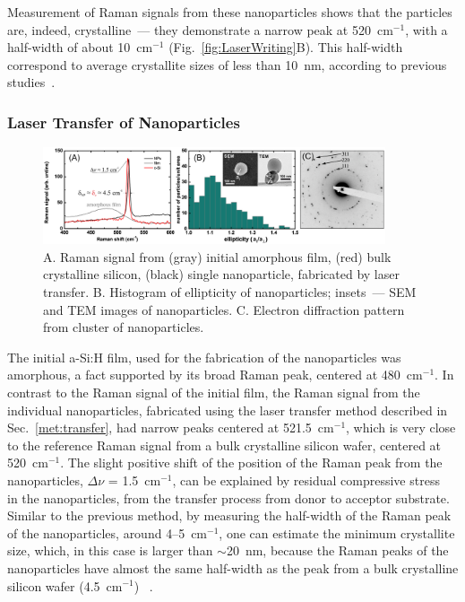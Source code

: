                 Measurement of Raman signals from these nanoparticles shows that the particles are, indeed, crystalline~---  they demonstrate
            a narrow peak at 520~cm$^{-1}$, with a half-width of about 10~cm$^{-1}$ (Fig.~\ref{fig:LaserWriting}B).
            This half-width correspond to average crystallite sizes of less than 10~nm, according to previous studies~\cite{campbell1986effects}.

        \subsubsection{Laser Transfer of Nanoparticles}
            \begin{figure}[!ht]
                    \begin{center}
                        \includegraphics[width=0.9\textwidth]{figs/results/fab/Crystallinity.eps}
                    \end{center}
                    \caption{A. Raman signal from (gray) initial amorphous film, (red) bulk crystalline silicon, (black) single nanoparticle,
                    fabricated by laser transfer. B. Histogram of ellipticity of nanoparticles; insets~--- SEM and TEM images of nanoparticles. C.
                    Electron diffraction pattern from cluster of nanoparticles.}
                    \label{fig:Crystallinity}
            \end{figure}


                The initial a-Si:H film, used for the fabrication of the nanoparticles was amorphous, a fact supported by its broad Raman peak,
            centered at 480~cm$^{-1}$. In contrast to the Raman signal of the initial film, the Raman signal from the individual nanoparticles,
            fabricated using the laser transfer method described in Sec.~\ref{met:transfer}, had narrow peaks centered at 521.5~cm$^{-1}$, which
            is very close to the reference Raman signal from a bulk crystalline silicon wafer, centered at 520~cm$^{-1}$. The slight positive shift
            of the position of the Raman peak from the nanoparticles, $\Delta$$\nu$ = 1.5~cm$^{-1}$, can be explained by residual compressive stress
            ~\cite{de1996micro} in the nanoparticles, from the transfer process from donor to acceptor substrate. Similar to the previous method,
            by measuring the half-width of the Raman peak of the nanoparticles, around 4--5~cm$^{-1}$, one can estimate the minimum crystallite size,
            which, in this case is larger than $\sim$20~nm, because the Raman peaks of the nanoparticles have
            almost the same half-width as the peak from a bulk crystalline silicon wafer (4.5~cm$^{-1}$) ~\cite{campbell1986effects}.

